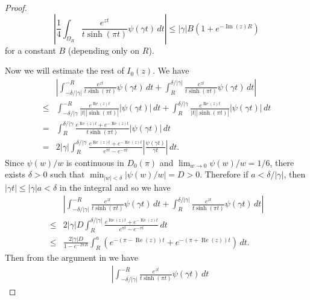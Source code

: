 \documentclass[a4paper]{amsart}
\theoremstyle{plain}
\theoremstyle{definition}
\theoremstyle{remark}
\renewcommand{\Re}{\operatorname{Re}}
\renewcommand{\Im}{\operatorname{Im}}
\numberwithin{equation}{section}
\begin{document}
\begin{proof}
\begin{equation*}
  \left|
    \frac{1}{4}
    \int_{\Omega_R}
    \frac{e^{zt}}{t\sinh(\pi t)}\psi(\gamma t)\,dt
  \right|
  \le
  |\gamma|B(1+e^{-\Im(z)R})
\end{equation*}
for a constant $B$ (depending only on $R$).
\par
Now we will estimate the rest of $I_0(z)$.
We have
\begin{equation*}
\begin{split}
  &\left|
    \int_{-\delta/|\gamma|}^{-R}\frac{e^{zt}}{t\sinh(\pi t)}\psi(\gamma t)\,dt
    +
    \int_{R}^{\delta/|\gamma|}\frac{e^{zt}}{t\sinh(\pi t)}\psi(\gamma t)\,dt
  \right|
  \\
  \le&
  \int_{-\delta/|\gamma}^{-R}
  \frac{e^{\Re(z)t}}{|t||\sinh(\pi t)|}|\psi(\gamma t)|\,dt
  +
  \int_{R}^{\delta/|\gamma}
  \frac{e^{\Re(z)t}}{|t||\sinh(\pi t)|}|\psi(\gamma t)|\,dt
  \\
  =&
  \int_{R}^{\delta/|\gamma}
  \frac{e^{\Re(z)t}+e^{-\Re(z)t}}{t\sinh(\pi t)}
  |\psi(\gamma t)|\,dt
  \\
  =&
  2|\gamma|
  \int_{R}^{\delta/|\gamma}
  \frac{e^{\Re(z)t}+e^{-\Re(z)t}}{e^{\pi t}-e^{-\pi t}}
  \left|\frac{\psi(\gamma t)}{\gamma t}\right|\,dt.
\end{split}
\end{equation*}
Since $\psi(w)/w$ is continuous in $D_0(\pi)$ and $\lim_{w\to0}\psi(w)/w=1/6$, there exists $\delta>0$ such that $\min_{|w|<\delta}|\psi(w)/w|=D>0$.
Therefore if $a<\delta/|\gamma|$, then $|\gamma t|\le|\gamma|a<\delta$ in the integral and so we have
\begin{equation*}
\begin{split}
  &\left|
    \int_{-\delta/|\gamma|}^{-R}
    \frac{e^{zt}}{t\sinh(\pi t)}\psi(\gamma t)\,dt
    +
    \int_{R}^{\delta/|\gamma|}
    \frac{e^{zt}}{t\sinh(\pi t)}\psi(\gamma t)\,dt
  \right|
  \\
  \le&
  2|\gamma|D
  \int_{R}^{\delta/|\gamma|}
  \frac{e^{\Re(z)t}+e^{-\Re(z)t}}{e^{\pi t}-e^{-\pi t}}
  \,dt
  \\
  \le&
  \frac{2|\gamma|D}{1-e^{-2\pi R}}
  \int_{R}^{a}(e^{-(\pi-\Re(z))t}+e^{-(\pi+\Re(z))t})
  \,dt.
\end{split}
\end{equation*}
Then from the argument in \cite[Page~533]{Andersen/Hansen:JKNOT2006} we have
\begin{equation*}
\begin{split}
  &\left|
    \int_{-\delta/|\gamma|}^{-R}
    \frac{e^{zt}}{t\sinh(\pi t)}\psi(\gamma t)\,dt

\end{split}
\end{equation*}
\end{proof}
\end{document}
